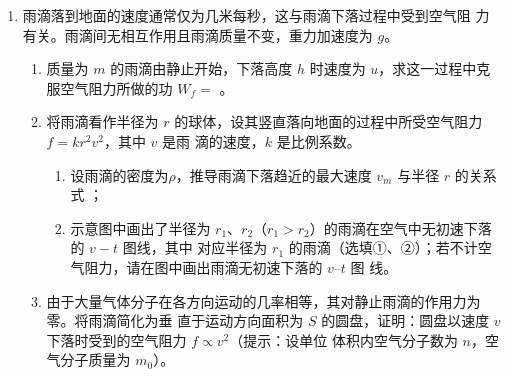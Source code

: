 \begin{enumerate}
{}



\newpage
\item 
{}
雨滴落到地面的速度通常仅为几米每秒，这与雨滴下落过程中受到空气阻
力有关。雨滴间无相互作用且雨滴质量不变，重力加速度为 $ g $。
\begin{enumerate}
\renewcommand{\labelenumi}{\arabic{enumi}.}
\item
质量为 $ m $ 的雨滴由静止开始，下落高度 $ h $ 时速度为 $ u $，求这一过程中克服空气阻力所做的功
$ W_{f} = $  。




\item 
将雨滴看作半径为 $ r $ 的球体，设其竖直落向地面的过程中所受空气阻力 $ f=k r^{2} v^{2} $，其中 $ v $ 是雨
滴的速度，$ k $ 是比例系数。
\begin{figure}[h!]
\centering

\end{figure}

\begin{enumerate}
\renewcommand{\labelenumiii}{\alph{enumiii}.}
\item
设雨滴的密度为$ \rho $，推导雨滴下落趋近的最大速度 $ v_{m} $ 与半径 $ r $ 的关系式  ；

\item 
示意图中画出了半径为 $ r_{1} $、$ r_{2} $（$ r_{1} > r_{2} $）的雨滴在空气中无初速下落的 $ v - t $ 图线，其中  
对应半径为 $ r_{1} $ 的雨滴（选填①、②）；若不计空气阻力，请在图中画出雨滴无初速下落的 $ v $–$ t $ 图
线。

% 



\end{enumerate}



\item 
由于大量气体分子在各方向运动的几率相等，其对静止雨滴的作用力为零。将雨滴简化为垂
直于运动方向面积为 $ S $ 的圆盘，证明：圆盘以速度 $ v $ 下落时受到的空气阻力 $ f \propto v^{2} $（提示：设单位
体积内空气分子数为 $ n $，空气分子质量为 $ m_{0} $）。


\end{enumerate}
\end{enumerate}
